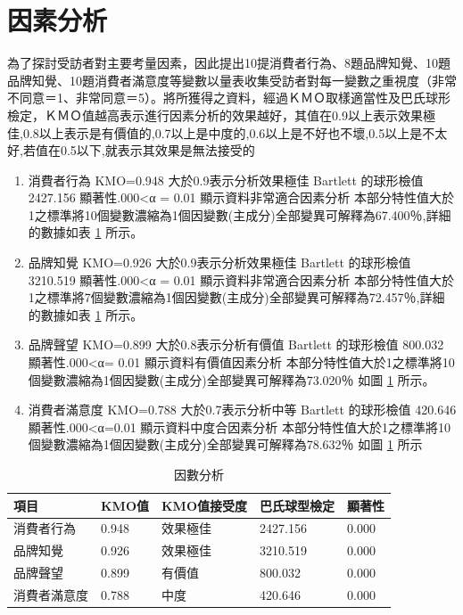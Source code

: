 \section{因素分析}
為了探討受訪者對主要考量因素，因此提出10提消費者行為、8題品牌知覺、10題品牌知覺、10題消費者滿意度等變數以量表收集受訪者對每一變數之重視度（非常不同意＝1、非常同意＝5）。將所獲得之資料，經過ＫＭＯ取樣適當性及巴氏球形檢定，ＫＭＯ值越高表示進行因素分析的效果越好，其值在0.9以上表示效果極佳,0.8以上表示是有價值的,0.7以上是中度的,0.6以上是不好也不壞,0.5以上是不太好,若值在0.5以下,就表示其效果是無法接受的
\begin{enumerate}
\item 消費者行為
KMO=0.948 大於0.9表示分析效果極佳 Bartlett 的球形檢值 2427.156 顯著性.000<α = 0.01 顯示資料非常適合因素分析  本部分特性值大於1之標準將10個變數濃縮為1個因變數(主成分)全部變異可解釋為67.400％,詳細的數據如表  \ref{tab:p4} 所示。
\item 品牌知覺
KMO=0.926 大於0.9表示分析效果極佳 Bartlett 的球形檢值 3210.519 顯著性.000<α = 0.01 顯示資料非常適合因素分析  本部分特性值大於1之標準將7個變數濃縮為1個因變數(主成分)全部變異可解釋為72.457％,詳細的數據如表  \ref{tab:p4} 所示。
\item 品牌聲望
KMO=0.899 大於0.8表示分析有價值 Bartlett 的球形檢值 800.032 顯著性.000<α= 0.01 顯示資料有價值因素分析  本部分特性值大於1之標準將10個變數濃縮為1個因變數(主成分)全部變異可解釋為73.020％ 如圖 \ref{tab:p4}  所示。
\item 消費者滿意度
KMO=0.788 大於0.7表示分析中等 Bartlett 的球形檢值 420.646 顯著性.000<α=0.01 顯示資料中度合因素分析  本部分特性值大於1之標準將10個變數濃縮為1個因變數(主成分)全部變異可解釋為78.632％ 如圖 \ref{tab:p4} 所示
\end{enumerate}

\begin{table}[htb]
\caption{因數分析}
\label{tab:p4}
\renewcommand{\arraystretch}{1.2} %
\arrayrulewidth=1pt               %
\tabcolsep=16pt                   %
\begin{tabular}[t]{lllll}  %
\hline
 項目& KMO值 & KMO值接受度& 巴氏球型檢定&顯著性 \\
\hline
消費者行為&0.948&效果極佳&2427.156&0.000\\
 品牌知覺&0.926&效果極佳&3210.519&0.000\\
 品牌聲望&0.899&有價值&800.032&0.000 \\
消費者滿意度&0.788&中度&420.646&0.000\\
\hline
\end{tabular}
\end{table}

